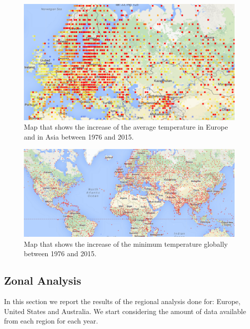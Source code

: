 \documentclass{vldb}
\begin{document}
\begin{figure}[tbh]
\includegraphics[width=1\linewidth]{increaseEurope}
\caption{Map that shows the increase of the average temperature in Europe and in Asia between 1976 and 2015.}
\label{fig:interface}
\end{figure}

\begin{figure}[tbh]
\includegraphics[width=1\linewidth]{increaseGlobal}
\caption{Map that shows the increase of the minimum temperature globally between 1976 and 2015.}
\label{fig:interface}
\end{figure}

\subsection{Zonal Analysis}
In this section we report the results of the regional analysis done for: Europe, United States and Australia. We start considering the amount of data available from each region for each year. 
\end{document}
